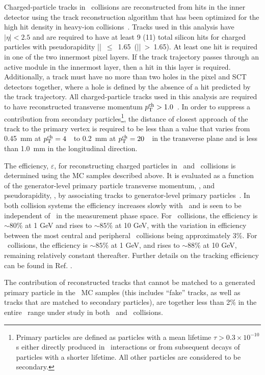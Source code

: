 Charged-particle tracks in \pbpb\ collisions are reconstructed from hits in the inner detector using the 
track reconstruction algorithm that has been optimized for the high hit density in heavy-ion
collisions~\cite{Aaboud:2017all}.
Tracks used in this analysis have $|\eta| < 2.5$ and are required to have at least 9 (11) total silicon hits for charged particles with pseudorapidity \mbox{|\etatrk| $\leq$ 1.65 (|\etatrk| > 1.65)}.  At least one hit is required in one of the two innermost pixel layers.
If the track trajectory passes through an active module in the innermost layer, then 
a hit in this layer is required. Additionally, a track must 
have no more than two holes in the pixel and SCT detectors together, where 
a hole is defined by the absence of a hit predicted by the track 
trajectory. 
All charged-particle tracks used in this analysis are required to have reconstructed transverse momentum $\mbox{$p_{\mathrm{T}}^{\mathrm{ch}}$} > 1.0 $~\GeV. In order to suppress a contribution from
secondary particles\footnote{Primary particles are defined as particles with a mean lifetime $\tau>0.3\times 10^{-10}$ s either directly produced in \pp\ interactions or from subsequent decays of particles with a shorter lifetime. All other particles are considered to be secondary.}, the distance of closest approach of the track to the primary vertex is required to be less than a value that varies from 0.45~mm at $\mbox{$p_{\mathrm{T}}^{\mathrm{ch}}$}=4$~\GeV\ to 0.2~mm at $\mbox{$p_{\mathrm{T}}^{\mathrm{ch}}$}=20$~\GeV\ in the transverse plane and is less than 1.0~mm in the longitudinal direction.


The efficiency, $\varepsilon$, for reconstructing charged particles in \PbPb\ and \pp\ collisions is determined using the MC samples described above. It is evaluated as a function of the generator-level primary particle transverse momentum, \pTtrue, and pseudorapidity, \etatrue, by associating tracks to generator-level primary particles~\cite{Aad:2010ah}. In both collision systems the efficiency increases slowly with \pTtrue\ and is seen to be independent of \ptjet\ in the measurement phase space. For \pbpb\ collisions, the efficiency is $\sim 80\%$ at 1 GeV and rises to $\sim 85\%$ at 10 GeV, with the variation in efficiency between the most central and peripheral \pbpb\ collisions being approximately 3\%. For \pp\ collisions, the efficiency is $\sim85\%$ at 1 GeV, and rises to $\sim 88 \%$ at 10 GeV, remaining relatively constant thereafter. Further details on the tracking efficiency can be found in Ref. \cite{Aaboud:2017bzv}. 

The contribution of reconstructed tracks that cannot be matched to a generated primary particle in the \pp\ MC samples (this includes ``fake'' tracks, as well as tracks that are matched to secondary particles), are together less than 2\% in the entire \pttrk\ range under study in both \pp\ and \pbpb\ collisions.  








